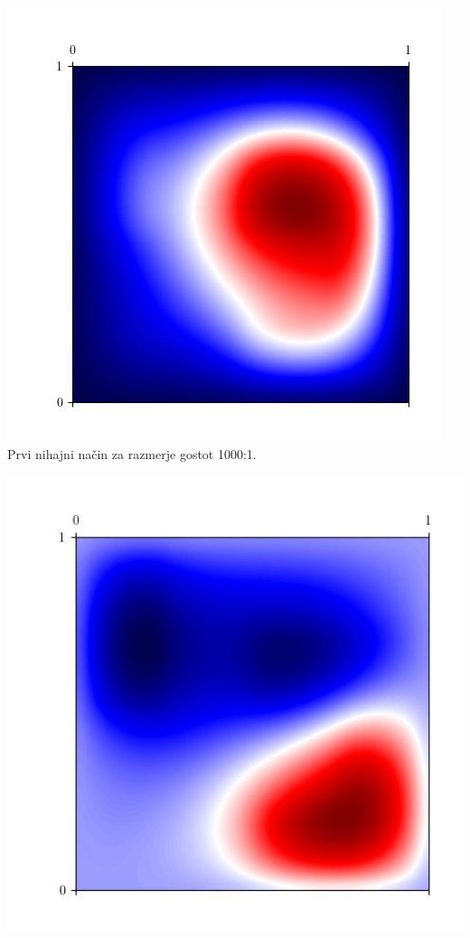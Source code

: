 \begin{center}
    \centering
        \begin{minipage}{0.45\textwidth}
        \centering
    \includegraphics[width=\textwidth]{../old/1-1-eigenmode-0.jpg}
    Prvi nihajni način za razmerje gostot 1000:1.
    \end{minipage}\hfill
    \begin{minipage}{0.45\textwidth}
        \centering
        \includegraphics[width=1\textwidth]{../old/1-1-eigenmode-1.jpg}

\end{minipage}
\end{center}

